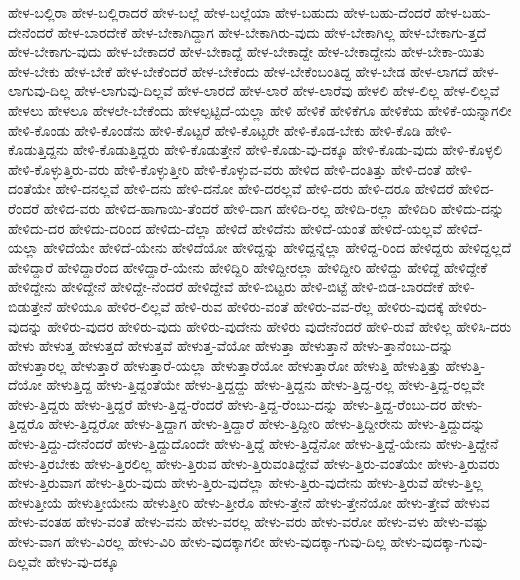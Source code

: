 {ಹೇಳ-ಬಲ್ಲಿರಾ
ಹೇಳ-ಬಲ್ಲಿರಾದರೆ
ಹೇಳ-ಬಲ್ಲೆ
ಹೇಳ-ಬಲ್ಲೆಯಾ
ಹೇಳ-ಬಹುದು
ಹೇಳ-ಬಹು-ದೆಂದರೆ
ಹೇಳ-ಬಹು-ದೇನೆಂದರೆ
ಹೇಳ-ಬಾರದೇಕೆ
ಹೇಳ-ಬೇಕಾಗಿದ್ದಾಗ
ಹೇಳ-ಬೇಕಾಗಿರು-ವುದು
ಹೇಳ-ಬೇಕಾಗಿಲ್ಲ
ಹೇಳ-ಬೇಕಾಗು-ತ್ತದೆ
ಹೇಳ-ಬೇಕಾಗು-ವುದು
ಹೇಳ-ಬೇಕಾದರೆ
ಹೇಳ-ಬೇಕಾದ್ದೆ
ಹೇಳ-ಬೇಕಾದ್ದೇ
ಹೇಳ-ಬೇಕಾದ್ದೇನು
ಹೇಳ-ಬೇಕಾ-ಯಿತು
ಹೇಳ-ಬೇಕು
ಹೇಳ-ಬೇಕೆ
ಹೇಳ-ಬೇಕೆಂದರೆ
ಹೇಳ-ಬೇಕೆಂದು
ಹೇಳ-ಬೇಕೆಂಬಂತಿದ್ದ
ಹೇಳ-ಬೇಡ
ಹೇಳ-ಲಾಗದೆ
ಹೇಳ-ಲಾಗುವು-ದಿಲ್ಲ
ಹೇಳ-ಲಾಗುವು-ದಿಲ್ಲವೆ
ಹೇಳ-ಲಾರದೆ
ಹೇಳ-ಲಾರೆ
ಹೇಳ-ಲಾರೆವು
ಹೇಳಲಿ
ಹೇಳ-ಲಿಲ್ಲ
ಹೇಳ-ಲಿಲ್ಲವೆ
ಹೇಳಲು
ಹೇಳಲೂ
ಹೇಳಲೇ-ಬೇಕೆಂದು
ಹೇಳಲ್ಪಟ್ಟಿದೆ-ಯಲ್ಲಾ
ಹೇಳಿ
ಹೇಳಿಕೆ
ಹೇಳಿಕೆಗೂ
ಹೇಳಿಕೆಯ
ಹೇಳಿಕೆ-ಯನ್ನಾಗಲೀ
ಹೇಳಿ-ಕೊಂಡು
ಹೇಳಿ-ಕೊಂಡೆನು
ಹೇಳಿ-ಕೊಟ್ಟರೆ
ಹೇಳಿ-ಕೊಟ್ಟರೇ
ಹೇಳಿ-ಕೊಡ-ಬೇಕು
ಹೇಳಿ-ಕೊಡಿ
ಹೇಳಿ-ಕೊಡುತ್ತಿದ್ದನು
ಹೇಳಿ-ಕೊಡುತ್ತಿದ್ದರು
ಹೇಳಿ-ಕೊಡುತ್ತೇನೆ
ಹೇಳಿ-ಕೊಡು-ವು-ದಕ್ಕೂ
ಹೇಳಿ-ಕೊಡು-ವುದು
ಹೇಳಿ-ಕೊಳ್ಳಲಿ
ಹೇಳಿ-ಕೊಳ್ಳುತ್ತಿರು-ವರು
ಹೇಳಿ-ಕೊಳ್ಳುತ್ತೀರಿ
ಹೇಳಿ-ಕೊಳ್ಳುವ-ವರು
ಹೇಳಿದ
ಹೇಳಿ-ದಂತಿತ್ತು
ಹೇಳಿ-ದಂತೆ
ಹೇಳಿ-ದಂತೆಯೇ
ಹೇಳಿ-ದನಲ್ಲವೆ
ಹೇಳಿ-ದನು
ಹೇಳಿ-ದನೋ
ಹೇಳಿ-ದರಲ್ಲವೆ
ಹೇಳಿ-ದರು
ಹೇಳಿ-ದರೂ
ಹೇಳಿದರೆ
ಹೇಳಿದ-ರೆಂದರೆ
ಹೇಳಿದ-ವರು
ಹೇಳಿದ-ಹಾಗಾಯಿ-ತೆಂದರೆ
ಹೇಳಿ-ದಾಗ
ಹೇಳಿದಿ-ರಲ್ಲ
ಹೇಳಿದಿ-ರಲ್ಲಾ
ಹೇಳಿದಿರಿ
ಹೇಳಿದು-ದನ್ನು
ಹೇಳಿದು-ದರ
ಹೇಳಿದು-ದರಿಂದ
ಹೇಳಿದು-ದೆಲ್ಲಾ
ಹೇಳಿದೆ
ಹೇಳಿದೆನು
ಹೇಳಿದೆ-ಯಂತೆ
ಹೇಳಿದೆ-ಯಲ್ಲವೆ
ಹೇಳಿದೆ-ಯಲ್ಲಾ
ಹೇಳಿದೆಯೇ
ಹೇಳಿದೆ-ಯೇನು
ಹೇಳಿದೆಯೋ
ಹೇಳಿದ್ದನ್ನು
ಹೇಳಿದ್ದನ್ನೆಲ್ಲಾ
ಹೇಳಿದ್ದ-ರಿಂದ
ಹೇಳಿದ್ದರು
ಹೇಳಿದ್ದಲ್ಲದೆ
ಹೇಳಿದ್ದಾರೆ
ಹೇಳಿದ್ದಾರೆಂದ
ಹೇಳಿದ್ದಾರೆ-ಯೇನು
ಹೇಳಿದ್ದಿರಿ
ಹೇಳಿದ್ದೀರಲ್ಲಾ
ಹೇಳಿದ್ದೀರಿ
ಹೇಳಿದ್ದು
ಹೇಳಿದ್ದೆ
ಹೇಳಿದ್ದೇಕೆ
ಹೇಳಿದ್ದೇನು
ಹೇಳಿದ್ದೇನೆ
ಹೇಳಿದ್ದೇ-ನೆಂದರೆ
ಹೇಳಿದ್ದೇವೆ
ಹೇಳಿ-ಬಿಟ್ಟರು
ಹೇಳಿ-ಬಿಟ್ಟೆ
ಹೇಳಿ-ಬಿಡ-ಬಾರದೇಕೆ
ಹೇಳಿ-ಬಿಡುತ್ತೇನೆ
ಹೇಳಿಯೂ
ಹೇಳಿರ-ಲಿಲ್ಲವೆ
ಹೇಳಿ-ರುವ
ಹೇಳಿರು-ವಂತೆ
ಹೇಳಿರು-ವವ-ರೆಲ್ಲ
ಹೇಳಿರು-ವುದಕ್ಕೆ
ಹೇಳಿರು-ವುದನ್ನು
ಹೇಳಿರು-ವುದರ
ಹೇಳಿರು-ವುದು
ಹೇಳಿರು-ವುದೇನು
ಹೇಳಿರು ವುದೇನೆಂದರೆ
ಹೇಳಿ-ರುವೆ
ಹೇಳಿಲ್ಲ
ಹೇಳಿಸಿ-ದರು
ಹೇಳು
ಹೇಳುತ್ತ
ಹೇಳುತ್ತದೆ
ಹೇಳುತ್ತವೆ
ಹೇಳುತ್ತ-ವೆಯೋ
ಹೇಳುತ್ತಾ
ಹೇಳುತ್ತಾನೆ
ಹೇಳು-ತ್ತಾನೆಂಬು-ದನ್ನು
ಹೇಳುತ್ತಾರಲ್ಲ
ಹೇಳುತ್ತಾರೆ
ಹೇಳುತ್ತಾರೆ-ಯಲ್ಲಾ
ಹೇಳುತ್ತಾರೆಯೋ
ಹೇಳುತ್ತಾರೋ
ಹೇಳುತ್ತಿ
ಹೇಳುತ್ತಿತ್ತು
ಹೇಳುತ್ತಿ-ದೆಯೋ
ಹೇಳುತ್ತಿದ್ದ
ಹೇಳು-ತ್ತಿದ್ದಂತೆಯೇ
ಹೇಳು-ತ್ತಿದ್ದದ್ದು
ಹೇಳು-ತ್ತಿದ್ದನು
ಹೇಳು-ತ್ತಿದ್ದ-ರಲ್ಲ
ಹೇಳು-ತ್ತಿದ್ದ-ರಲ್ಲವೇ
ಹೇಳು-ತ್ತಿದ್ದರು
ಹೇಳು-ತ್ತಿದ್ದರೆ
ಹೇಳು-ತ್ತಿದ್ದ-ರೆಂದರೆ
ಹೇಳು-ತ್ತಿದ್ದ-ರೆಂಬು-ದನ್ನು
ಹೇಳು-ತ್ತಿದ್ದ-ರೆಂಬು-ದರ
ಹೇಳು-ತ್ತಿದ್ದರೊ
ಹೇಳು-ತ್ತಿದ್ದರೋ
ಹೇಳು-ತ್ತಿದ್ದಾಗ
ಹೇಳು-ತ್ತಿದ್ದಾರೆ
ಹೇಳು-ತ್ತಿದ್ದೀರಿ
ಹೇಳು-ತ್ತಿದ್ದೀರೇನು
ಹೇಳು-ತ್ತಿದ್ದುದನ್ನು
ಹೇಳು-ತ್ತಿದ್ದು-ದೇನೆಂದರೆ
ಹೇಳು-ತ್ತಿದ್ದುದೊಂದೇ
ಹೇಳು-ತ್ತಿದ್ದೆ
ಹೇಳು-ತ್ತಿದ್ದೆನೋ
ಹೇಳು-ತ್ತಿದ್ದೆ-ಯೇನು
ಹೇಳು-ತ್ತಿದ್ದೇನೆ
ಹೇಳು-ತ್ತಿರಬೇಕು
ಹೇಳು-ತ್ತಿರಲಿಲ್ಲ
ಹೇಳು-ತ್ತಿರುವ
ಹೇಳು-ತ್ತಿರುವಂತಿದ್ದೇವೆ
ಹೇಳು-ತ್ತಿರು-ವಂತೆಯೇ
ಹೇಳು-ತ್ತಿರುವರು
ಹೇಳು-ತ್ತಿರುವಾಗ
ಹೇಳು-ತ್ತಿರು-ವುದು
ಹೇಳು-ತ್ತಿರು-ವುದೆಲ್ಲಾ
ಹೇಳು-ತ್ತಿರು-ವುದೇನು
ಹೇಳು-ತ್ತಿರುವೆ
ಹೇಳು-ತ್ತಿಲ್ಲ
ಹೇಳುತ್ತೀಯೆ
ಹೇಳುತ್ತೀಯೇನು
ಹೇಳುತ್ತೀರಿ
ಹೇಳು-ತ್ತೀರೊ
ಹೇಳು-ತ್ತೇನೆ
ಹೇಳು-ತ್ತೇನೆಯೋ
ಹೇಳು-ತ್ತೇವೆ
ಹೇಳುವ
ಹೇಳು-ವಂತಹ
ಹೇಳು-ವಂತೆ
ಹೇಳು-ವನು
ಹೇಳು-ವರಲ್ಲ
ಹೇಳು-ವರು
ಹೇಳು-ವರೋ
ಹೇಳು-ವಳು
ಹೇಳು-ವಷ್ಟು
ಹೇಳು-ವಾಗ
ಹೇಳು-ವಿರಲ್ಲ
ಹೇಳು-ವಿರಿ
ಹೇಳು-ವುದಕ್ಕಾಗಲೀ
ಹೇಳು-ವುದಕ್ಕಾ-ಗುವು-ದಿಲ್ಲ
ಹೇಳು-ವುದಕ್ಕಾ-ಗುವು-ದಿಲ್ಲವೇ
ಹೇಳು-ವು-ದಕ್ಕೂ
}
